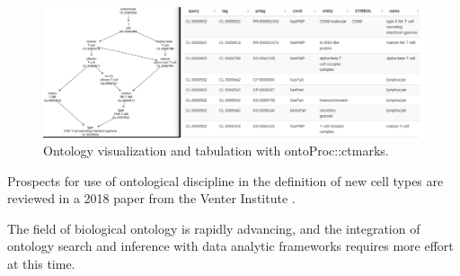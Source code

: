 \begin{figure}
\includegraphics[width=1\linewidth,]{ontoPair} \caption{Ontology visualization and tabulation with ontoProc::ctmarks.}\label{fig:ontopair}
\end{figure}

Prospects for use of ontological discipline in the
definition of new cell types are reviewed in a 2018
paper from the Venter Institute \cite{Aevermann2018}.

The field of biological ontology is rapidly advancing,
and the integration of ontology search and inference
with data analytic frameworks requires more effort at this time.

